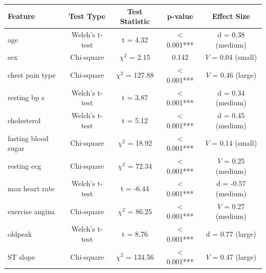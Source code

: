 \begin{tabular}{|l|c|c|c|c|}
\hline
\textbf{Feature} & \textbf{Test Type} & \textbf{Test Statistic} & \textbf{p-value} & \textbf{Effect Size} \\
\hline
age & Welch's t-test & t = 4.32 & < 0.001*** & d = 0.38 (medium) \\
\hline
sex & Chi-square & $\chi^2$ = 2.15 & 0.142 & $V$ = 0.04 (small) \\
\hline
chest pain type & Chi-square & $\chi^2$ = 127.88 & < 0.001*** & $V$ = 0.46 (large) \\
\hline
resting bp s & Welch's t-test & t = 3.87 & < 0.001*** & d = 0.34 (medium) \\
\hline
cholesterol & Welch's t-test & t = 5.12 & < 0.001*** & d = 0.45 (medium) \\
\hline
fasting blood sugar & Chi-square & $\chi^2$ = 18.92 & < 0.001*** & $V$ = 0.14 (small) \\
\hline
resting ecg & Chi-square & $\chi^2$ = 72.34 & < 0.001*** & $V$ = 0.25 (medium) \\
\hline
max heart rate & Welch's t-test & t = -6.44 & < 0.001*** & d = -0.57 (medium) \\
\hline
exercise angina & Chi-square & $\chi^2$ = 86.25 & < 0.001*** & $V$ = 0.27 (medium) \\
\hline
oldpeak & Welch's t-test & t = 8.76 & < 0.001*** & d = 0.77 (large) \\
\hline
ST slope & Chi-square & $\chi^2$ = 134.56 & < 0.001*** & $V$ = 0.47 (large) \\
\hline
\end{tabular}
